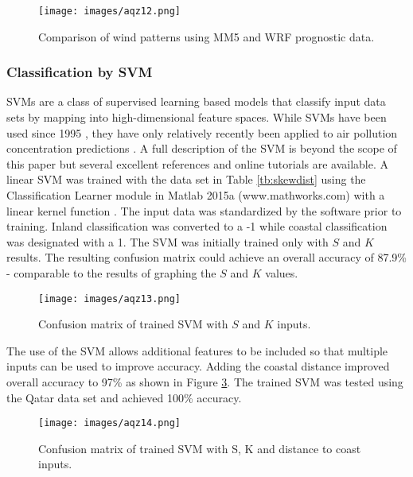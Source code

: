 %
\begin{figure}[H]
\texttt{[image: images/aqz12.png]} 
\caption[Comparison of wind patterns using prognostic data]{Comparison of wind patterns using MM5 and WRF prognostic data.}
\label{fig:12windcompare}
\end{figure}
%

\subsubsection{Classification by SVM}

SVMs are a class of supervised learning based models that classify input data sets by mapping into high-dimensional feature spaces. While SVMs have been used since 1995 \citep{Cortes1995}, they have only relatively recently been applied to air pollution concentration predictions \citep{Lu2005, Luna2014, Moazami2016}. A full description of the SVM is beyond the scope of this paper but several excellent references and online tutorials are available. A linear SVM was trained with the data set in Table \ref{tb:skewdist} using the Classification Learner module in Matlab 2015a (www.mathworks.com) with a linear kernel function \citep{Yang2011}. The input data was standardized by the software prior to training. Inland classification was converted to a -1 while coastal classification was designated with a 1. The SVM was initially trained only with $S$ and $K$ results. The resulting confusion matrix could achieve an overall accuracy of 87.9\% - comparable to the results of graphing the $S$ and $K$ values.  

%
\begin{figure}[H]
\texttt{[image: images/aqz13.png]} 
\caption{Confusion matrix of trained SVM with $S$ and $K$ inputs.}
\label{fig:13confusionSK}
\end{figure}
%

The use of the SVM allows additional features to be included so that multiple inputs can be used to improve accuracy. Adding the coastal distance improved overall accuracy to 97\% as shown in Figure \ref{fig:14confusionSKdist}. The trained SVM was tested using the Qatar data set and achieved 100\% accuracy. 

%
\begin{figure}[H]
\texttt{[image: images/aqz14.png]} 
\caption{Confusion matrix of trained SVM with S, K and distance to coast inputs.}
\label{fig:14confusionSKdist}
\end{figure}
%
 
